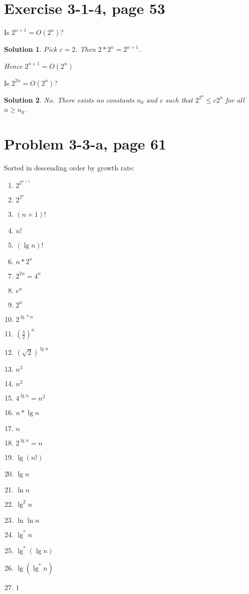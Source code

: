 \documentclass[letterpaper, 11pt]{article}
\theoremstyle{mystyle}
\newtheorem*{sln}{Solution}
\begin{document}
\section{Exercise 3-1-4, page 53}
Is $2^{n+1} = O(2^n)$? 

\begin{sln}
    Pick $c=2$. Then $2 * 2^n = 2^{n+1}$. 

    Hence $2^{n+1} = O(2^n)$
\end{sln}

Is $2^{2n} = O(2^n)$?

\begin{sln}
    No. There exists no constants $n_0$ and $c$ such that $2^{2^n} \leq c2^n$
    for all $n \geq n_0$. 
\end{sln}


\section{Problem 3-3-a, page 61}
    Sorted in descending order by growth rate: 
\begin{enumerate}
    \item $2^{2^{n+1}}$
    \item $2^{2^n}$
    \item $(n+1)!$
    \item $n!$
    \item $(\lg n)!$
    \item $n*2^n$
    \item $2^{2n} = 4^n$
    \item $e^n$
    \item $2^n$
    \item $2^{\lg* n}$
    \item $(\frac{3}{2})^n$
    \item $(\sqrt 2)^{\lg n}$
    \item $n^3$
    \item $n^2$
    \item $4^{\lg n} = n^2$ 
    \item $n * \lg n$
    \item $n$
    \item $2^{\lg n} = n$    
    \item $\lg (n!)$
    \item $\lg n$
    \item $\ln n$
    \item $\lg^2 n$
    \item $\ln \ln n$
    \item $\lg^* n$
    \item $\lg^*(\lg n)$
    \item $\lg(\lg^* n)$
    \item $1$
\end{enumerate} 
\end{document}

